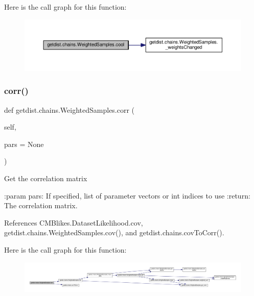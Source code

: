 Here is the call graph for this function\+:
\nopagebreak
\begin{figure}[H]
\begin{center}
\leavevmode
\includegraphics[width=350pt]{classgetdist_1_1chains_1_1WeightedSamples_ac1117664a18dbf44a352512c36c6a675_cgraph}
\end{center}
\end{figure}
\mbox{\label{classgetdist_1_1chains_1_1WeightedSamples_ad7fc11d463b6ebe773ecd156e7e7bcce}} 
\subsubsection{\texorpdfstring{corr()}{corr()}}
{\footnotesize\ttfamily def getdist.\+chains.\+Weighted\+Samples.\+corr (\begin{DoxyParamCaption}\item[{}]{self,  }\item[{}]{pars = {\ttfamily None} }\end{DoxyParamCaption})}

\begin{DoxyVerb}Get the correlation matrix

:param pars: If specified, list of parameter vectors or int indices to use
:return: The correlation matrix.
\end{DoxyVerb}
 

References C\+M\+Blikes.\+Dataset\+Likelihood.\+cov, getdist.\+chains.\+Weighted\+Samples.\+cov(), and getdist.\+chains.\+cov\+To\+Corr().

Here is the call graph for this function\+:
\nopagebreak
\begin{figure}[H]
\begin{center}
\leavevmode
\includegraphics[width=350pt]{classgetdist_1_1chains_1_1WeightedSamples_ad7fc11d463b6ebe773ecd156e7e7bcce_cgraph}
\end{center}
\end{figure}
\mbox{\label{classgetdist_1_1chains_1_1WeightedSamples_a61a1250aa6f6292f59f2e24e9df364f0}} 
